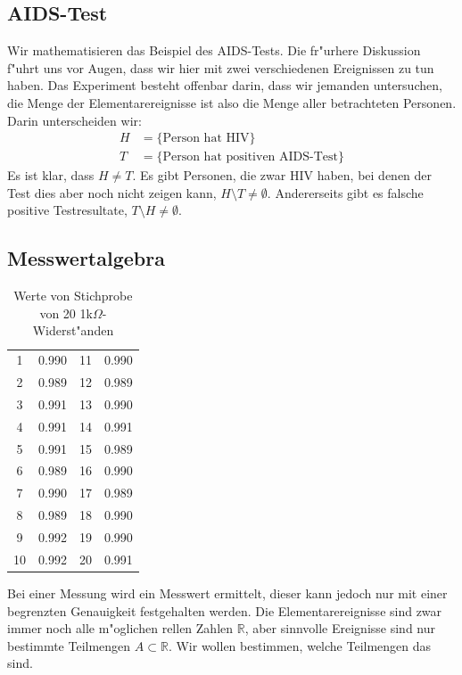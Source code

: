 \subsection{AIDS-Test}
Wir mathematisieren das Beispiel des AIDS-Tests.
Die fr"urhere Diskussion f"uhrt uns vor Augen,
dass wir hier mit zwei verschiedenen Ereignissen zu tun haben. 
Das Experiment besteht offenbar darin, dass wir jemanden untersuchen,
die Menge der Elementarereignisse ist also die Menge aller betrachteten
Personen.
Darin unterscheiden wir:
\begin{align*}
H&=\{\text{Person hat HIV}\}\\
T&=\{\text{Person hat positiven AIDS-Test}\}
\end{align*}
Es ist klar, dass $H\ne T$. Es gibt Personen, die zwar HIV haben, bei
denen der Test dies aber noch nicht zeigen kann, $H\setminus T\ne \emptyset$.
Andererseits gibt es falsche positive Testresultate,
$T\setminus H\ne\emptyset$. 

\subsection{Messwertalgebra}
\begin{table}
\begin{center}
\begin{tabular}{|cc|cc|}
\hline
1&0.990
&11&0.990\\
2&0.989
&12&0.989\\
3&0.991
&13&0.990\\
4&0.991
&14&0.991\\
5&0.991
&15&0.989\\
6&0.989
&16&0.990\\
7&0.990
&17&0.989\\
8&0.989
&18&0.990\\
9&0.992
&19&0.990\\
10&0.992
&20&0.991\\
\hline
\end{tabular}
\end{center}
\caption{Werte von Stichprobe von 20 1k$\Omega$-Widerst"anden\label{widerstandswerte}}
\end{table}
Bei einer Messung wird ein Messwert ermittelt, dieser kann jedoch
nur mit einer begrenzten Genauigkeit festgehalten werden.
Die Elementarereignisse sind zwar immer noch alle m"oglichen rellen
Zahlen $\mathbb R$, aber sinnvolle Ereignisse sind nur bestimmte Teilmengen
$A\subset\mathbb R$. Wir wollen bestimmen, welche Teilmengen das sind.

